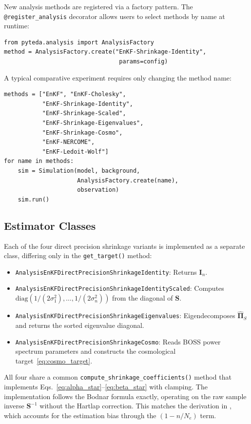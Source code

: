 New analysis methods are registered via a factory pattern. The \texttt{@register\_analysis} decorator allows users to select methods by name at runtime:

\begin{verbatim}
from pyteda.analysis import AnalysisFactory
method = AnalysisFactory.create("EnKF-Shrinkage-Identity",
                                 params=config)
\end{verbatim}

A typical comparative experiment requires only changing the method name:

\begin{verbatim}
methods = ["EnKF", "EnKF-Cholesky",
           "EnKF-Shrinkage-Identity",
           "EnKF-Shrinkage-Scaled",
           "EnKF-Shrinkage-Eigenvalues",
           "EnKF-Shrinkage-Cosmo",
           "EnKF-NERCOME",
           "EnKF-Ledoit-Wolf"]
for name in methods:
    sim = Simulation(model, background,
                     AnalysisFactory.create(name),
                     observation)
    sim.run()
\end{verbatim}

\subsection{Estimator Classes}
\label{sec:estimator_classes}

Each of the four direct precision shrinkage variants is implemented as a separate class, differing only in the \texttt{get\_target()} method:

\begin{itemize}
\item \texttt{AnalysisEnKFDirectPrecisionShrinkageIdentity}: Returns $\mathbf{I}_n$.
\item \texttt{AnalysisEnKFDirectPrecisionShrinkageIdentityScaled}: Computes $\text{diag}(1/(2\sigma_1^2), \ldots, 1/(2\sigma_n^2))$ from the diagonal of $\mathbf{S}$.
\item \texttt{AnalysisEnKFDirectPrecisionShrinkageEigenvalues}: Eigendecomposes $\hat{\boldsymbol{\Pi}}_S$ and returns the sorted eigenvalue diagonal.
\item \texttt{AnalysisEnKFDirectPrecisionShrinkageCosmo}: Reads BOSS power spectrum parameters and constructs the cosmological target~\eqref{eq:cosmo_target}.
\end{itemize}

All four share a common \texttt{compute\_shrinkage\_coefficients()} method that implements Eqs.~\eqref{eq:alpha_star}--\eqref{eq:beta_star} with clamping. The implementation follows the Bodnar formula exactly, operating on the raw sample inverse $\mathbf{S}^{-1}$ without the Hartlap correction. This matches the derivation in \citep{bodnar2016direct}, which accounts for the estimation bias through the $(1 - n/N_e)$ term.

